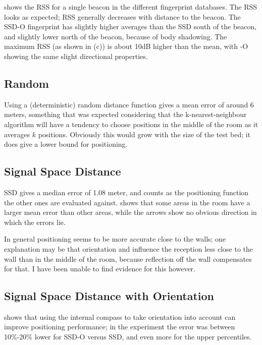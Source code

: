  shows the RSS for a single beacon in the different fingerprint databases.
The RSS looks as expected; RSS generally decreases with distance to the beacon.
The SSD-O fingerprint has slightly higher averages than the SSD south of the beacon, and slightly lower north of the beacon, because of body shadowing.
The maximum RSS (as shown in (c)) is about 10dB higher than the mean, with \aBRP-O showing the same slight directional properties.


\subsection{Random}
Using a (deterministic) random distance function gives a mean error of around 6 meters, something that was expected considering that the k-nearest-neighbour algorithm will have a tendency to choose positions in the middle of the room as it averages $k$ positions.
Obviously this would grow with the size of the test bed; it does give a lower bound for positioning.

\subsection{Signal Space Distance}
SSD gives a median error of 1.08 meter, and counts as the positioning function the other ones are evaluated against.
 shows that some areas in the room have a larger mean error than other areas, while the arrows show no obvious direction in which the errors lie.

In general positioning seems to be more accurate close to the walls; one explanation may be that orientation and \mpi influence the reception less close to the wall than in the middle of the room, because reflection off the wall compensates for that.
I have been unable to find evidence for this however.

\subsection{Signal Space Distance with Orientation}
\label{sec:architecture-measurements-ssd-o}
 shows that using the internal compass to take orientation into account can improve positioning performance; in the experiment the error was between 10\%-20\% lower for SSD-O versus SSD, and even more for the upper percentiles.

